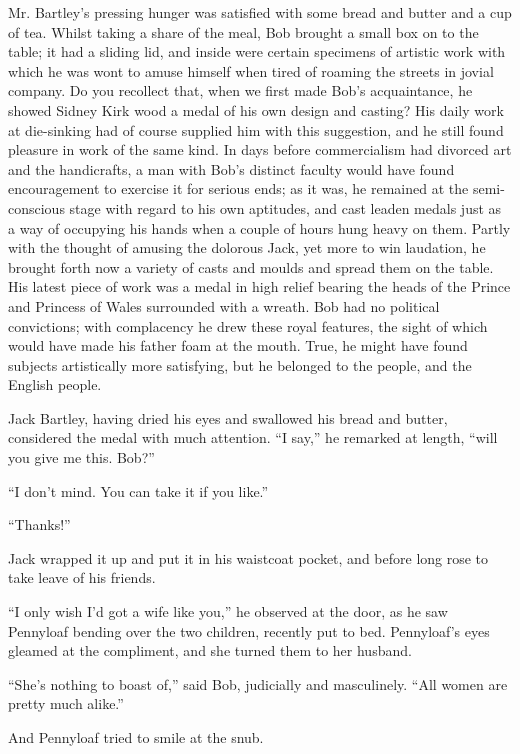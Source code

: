 Mr. Bartley's pressing hunger was satisfied with some bread and butter
and a cup of tea. Whilst taking a share of the meal, Bob brought a small
box on to the table; it had a sliding lid, and inside were certain
specimens of artistic work with which he was wont to amuse himself when
tired of roaming the streets in jovial company. Do you recollect that,
when we first made Bob's acquaintance, he showed Sidney Kirk wood a
medal of his own design and casting? His daily work at die-sinking had
of course supplied him with this suggestion, and he still found pleasure
in work of the same kind. In days before commercialism had divorced art
and the handicrafts, a man with Bob's distinct faculty would have found
encouragement to exercise it for serious ends; as it was, he remained at
the semi-conscious stage with regard to his own aptitudes, and cast
leaden medals just as a way of occupying his hands when a couple of
hours hung heavy on them. Partly with the thought of amusing the
dolorous Jack, yet more to win {}laudation, he brought forth now a
variety of casts and moulds and spread them on the table. His latest
piece of work was a medal in high relief bearing the heads of the Prince
and Princess of Wales surrounded with a wreath. Bob had no political
convictions; with complacency he drew these royal features, the sight of
which would have made his father foam at the mouth. True, he might have
found subjects artistically more satisfying, but he belonged to the
people, and the English people.

Jack Bartley, having dried his eyes and swallowed his bread and butter,
considered the medal with much attention. ``I say,'' he remarked at
length, ``will you give me this. Bob?''

``I don't mind. You can take it if you like.''

``Thanks!''

Jack wrapped it up and put it in his waistcoat pocket, and before long
rose to take leave of his friends.

``I only wish I'd got a wife like you,'' he observed at the door, as he
saw Pennyloaf bending over the two children, recently put to bed.
{}Pennyloaf's eyes gleamed at the compliment, and she turned them to her
husband.

``She's nothing to boast of,'' said Bob, judicially and masculinely.
``All women are pretty much alike.''

And Pennyloaf tried to smile at the snub.

